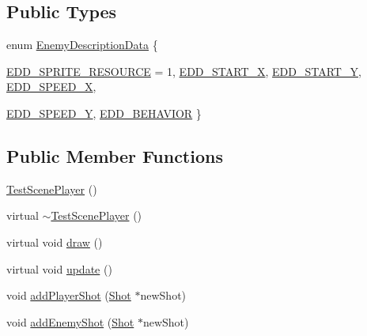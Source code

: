 \subsection*{Public Types}
\begin{DoxyCompactItemize}
\item 
enum \hyperlink{class_test_scene_player_a0072e80704a4a0bf0c0e0d165d2c54e4}{EnemyDescriptionData} \{ \par
\hyperlink{class_test_scene_player_a0072e80704a4a0bf0c0e0d165d2c54e4a4f83bf61616ba0f29c9644f621fcc847}{EDD\_\-SPRITE\_\-RESOURCE} =  1, 
\hyperlink{class_test_scene_player_a0072e80704a4a0bf0c0e0d165d2c54e4ad24ebd6ba2dd453c1503bb5ce391c6a7}{EDD\_\-START\_\-X}, 
\hyperlink{class_test_scene_player_a0072e80704a4a0bf0c0e0d165d2c54e4aaa6042868eb718491f25d62285bbc802}{EDD\_\-START\_\-Y}, 
\hyperlink{class_test_scene_player_a0072e80704a4a0bf0c0e0d165d2c54e4a3ece89b82fd905bdb4441d416ba05cde}{EDD\_\-SPEED\_\-X}, 
\par
\hyperlink{class_test_scene_player_a0072e80704a4a0bf0c0e0d165d2c54e4a59205b701a679a069c5f4492dfa0fe2f}{EDD\_\-SPEED\_\-Y}, 
\hyperlink{class_test_scene_player_a0072e80704a4a0bf0c0e0d165d2c54e4a25fd718425e72f6131d685f2b2eef6ec}{EDD\_\-BEHAVIOR}
 \}
\end{DoxyCompactItemize}
\subsection*{Public Member Functions}
\begin{DoxyCompactItemize}
\item 
\hyperlink{class_test_scene_player_a57de11c1a82f2680f88c183f52bff381}{TestScenePlayer} ()
\item 
virtual \hyperlink{class_test_scene_player_ade2a77d3f2edd8d037b2cba2796500c9}{$\sim$TestScenePlayer} ()
\item 
virtual void \hyperlink{class_test_scene_player_a17140146d2a39f10eb3aed81c067ec24}{draw} ()
\item 
virtual void \hyperlink{class_test_scene_player_a8285c9f16119d8423a0ed4858327097c}{update} ()
\item 
void \hyperlink{class_test_scene_player_add7c45987005966e06ce65159f4cd343}{addPlayerShot} (\hyperlink{class_shot}{Shot} $\ast$newShot)
\item 
void \hyperlink{class_test_scene_player_af1b8508a360ec7d4adc231a6f841c897}{addEnemyShot} (\hyperlink{class_shot}{Shot} $\ast$newShot)
\end{DoxyCompactItemize}


